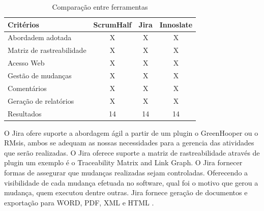 \begin{table}[H]
    \centering
    \caption{Comparação entre ferramentas}
    \begin{tabular}{l|c|c|c}
        \hline
        Critérios & ScrumHalf &  Jira & Innoslate \\ [6pt]
        \hline
        Abordadem adotada & X & X & X\\
        \hline
        Matriz de rastreabilidade & X & X & X \\
        \hline
        Acesso Web & X & X & X \\
        \hline
        Gestão de mudanças & X & X & X\\
        \hline
        Comentários & X & X & X \\
        \hline
        Geração de relatórios & X & X & X \\
        \hline
        Resultados & 14 & 14 & 14 \\
    \end{tabular}
\end{table}

O Jira ofere suporte a abordagem ágil a partir de um plugin o GreenHooper ou o RMsis, ambos se adequam as nossas necessidades para a gerencia das atividades que serão realizadas. 
O Jira oferece suporte a matriz de rastreabilidade através de plugin um exemplo é o Traceability Matrix and Link Graph.
O Jira fornecer formas de assegurar que mudanças realizadas sejam controladas. Oferecendo a visibilidade de cada mudança efetuada no software, qual foi o motivo que gerou a mudança, quem executou dentre outras.
Jira fornece geração de documentos e exportação para WORD, PDF, XML e HTML \cite{jira2016}.

